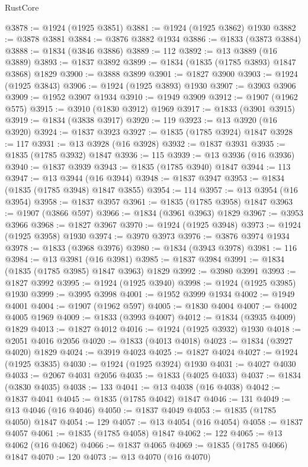 \begin{lexlean}{RustCore}
\begin{coremodule}
@3878 := @1924 (@1925 @3851)
@3881 := @1924 (@1925 @3862) @1930
@3882 := @3878 @3881
@3884 := @3876 @3882 @1934
@3886 := @1833 (@3873 @3884)
@3888 := @1834 (@3846 @3886)
@3889 := 112
@3892 := @13 @3889 (@16 @3889)
@3893 := @1837 @3892
@3899 := @1834 (@1835 (@1785 @3893) @1847 @3868) @1829
@3900 := @3888 @3899
@3901 := @1827 @3900
@3903 := @1924 (@1925 @3843)
@3906 := @1924 (@1925 @3893) @1930
@3907 := @3903 @3906
@3909 := @1952 @3907 @1934
@3910 := @1949 @3909
@3912 := @1907 (@1962 @575)
@3915 := @3910 (@1830 @3912) @1969
@3917 := @1833 (@3901 @3915)
@3919 := @1834 (@3838 @3917)
@3920 := 119
@3923 := @13 @3920 (@16 @3920)
@3924 := @1837 @3923
@3927 := @1835 (@1785 @3924) @1847
@3928 := 117
@3931 := @13 @3928 (@16 @3928)
@3932 := @1837 @3931
@3935 := @1835 (@1785 @3932) @1847
@3936 := 115
@3939 := @13 @3936 (@16 @3936)
@3940 := @1837 @3939
@3943 := @1835 (@1785 @3940) @1847
@3944 := 113
@3947 := @13 @3944 (@16 @3944)
@3948 := @1837 @3947
@3953 := @1834 (@1835 (@1785 @3948) @1847 @3855)
@3954 := 114
@3957 := @13 @3954 (@16 @3954)
@3958 := @1837 @3957
@3961 := @1835 (@1785 @3958) @1847
@3963 := @1907 (@3866 @597)
@3966 := @1834 (@3961 @3963) @1829
@3967 := @3953 @3966
@3968 := @1827 @3967
@3970 := @1924 (@1925 @3948)
@3973 := @1924 (@1925 @3958) @1930
@3974 := @3970 @3973
@3976 := @3876 @3974 @1934
@3978 := @1833 (@3968 @3976)
@3980 := @1834 (@3943 @3978)
@3981 := 116
@3984 := @13 @3981 (@16 @3981)
@3985 := @1837 @3984
@3991 := @1834 (@1835 (@1785 @3985) @1847 @3963) @1829
@3992 := @3980 @3991
@3993 := @1827 @3992
@3995 := @1924 (@1925 @3940)
@3998 := @1924 (@1925 @3985) @1930
@3999 := @3995 @3998
@4001 := @1952 @3999 @1934
@4002 := @1949 @4001
@4004 := @1907 (@1962 @597)
@4005 := @1830 @4004
@4007 := @4002 @4005 @1969
@4009 := @1833 (@3993 @4007)
@4012 := @1834 (@3935 @4009) @1829
@4013 := @1827 @4012
@4016 := @1924 (@1925 @3932) @1930
@4018 := @2051 @4016 @2056
@4020 := @1833 (@4013 @4018)
@4023 := @1834 (@3927 @4020) @1829
@4024 := @3919 @4023
@4025 := @1827 @4024
@4027 := @1924 (@1925 @3835)
@4030 := @1924 (@1925 @3924) @1930
@4031 := @4027 @4030
@4033 := @2067 @4031 @2056
@4035 := @1833 (@4025 @4033)
@4037 := @1834 (@3830 @4035)
@4038 := 133
@4041 := @13 @4038 (@16 @4038)
@4042 := @1837 @4041
@4045 := @1835 (@1785 @4042) @1847
@4046 := 131
@4049 := @13 @4046 (@16 @4046)
@4050 := @1837 @4049
@4053 := @1835 (@1785 @4050) @1847
@4054 := 129
@4057 := @13 @4054 (@16 @4054)
@4058 := @1837 @4057
@4061 := @1835 (@1785 @4058) @1847
@4062 := 122
@4065 := @13 @4062 (@16 @4062)
@4066 := @1837 @4065
@4069 := @1835 (@1785 @4066) @1847
@4070 := 120
@4073 := @13 @4070 (@16 @4070)

\end{coremodule}
\end{lexlean}
